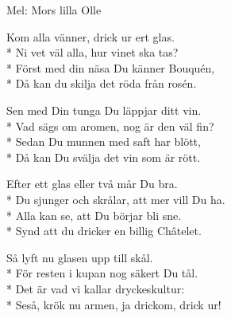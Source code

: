 \begin{SongText}
    \begin{SongInfo}
        Mel: Mors lilla Olle
    \end{SongInfo}
    \begin{SongVerse}
        Kom alla vänner, drick ur ert glas.\\*%
        Ni vet väl alla, hur vinet ska tas?\\*%
        Först med din näsa Du känner Bouquén,\\*%
        Då kan du skilja det röda från rosén.
    \end{SongVerse}
    \begin{SongVerse}
        Sen med Din tunga Du läppjar ditt vin.\\*%
        Vad sägs om aromen, nog är den väl fin?\\*%
        Sedan Du munnen med saft har blött,\\*%
        Då kan Du svälja det vin som är rött.
    \end{SongVerse}
    \begin{SongVerse}
        Efter ett glas eller två mår Du bra.\\*%
        Du sjunger och skrålar, att mer vill Du ha.\\*%
        Alla kan se, att Du börjar bli sne.\\*%
        Synd att du dricker en billig Châtelet.
    \end{SongVerse}
    \begin{SongVerse}
        Så lyft nu glasen upp till skål.\\*%
        För resten i kupan nog säkert Du tål.\\*%
        Det är vad vi kallar dryckeskultur:\\*%
        Seså, krök nu armen, ja drickom, drick ur!
    \end{SongVerse}
\end{SongText}
\newpage